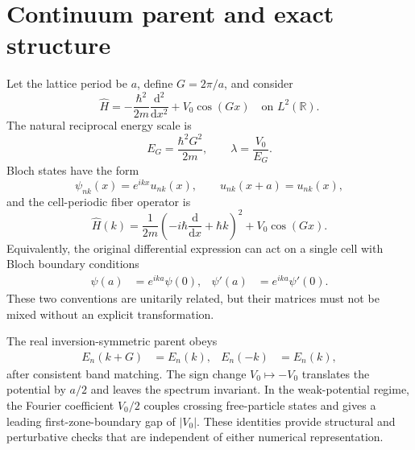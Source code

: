 \section{Continuum parent and exact structure}

Let the lattice period be $a$, define $G=2\pi/a$, and consider
\begin{equation}
    \hat H
    =
    -\frac{\hbar^2}{2m}
    \frac{\mathrm{d}^2}{\mathrm{d}x^2}
    +V_0\cos(Gx)
    \quad\text{on }L^2(\mathbb R).
    \label{eq:periodic-1d-parent}
\end{equation}
The natural reciprocal energy scale is
\begin{equation}
    E_G=\frac{\hbar^2G^2}{2m},
    \qquad
    \lambda=\frac{V_0}{E_G}.
    \label{eq:periodic-1d-scales}
\end{equation}
Bloch states have the form
\begin{equation}
    \psi_{nk}(x)=e^{ikx}u_{nk}(x),
    \qquad
    u_{nk}(x+a)=u_{nk}(x),
\end{equation}
and the cell-periodic fiber operator is
\begin{equation}
    \hat H(k)
    =
    \frac{1}{2m}
    \left(-i\hbar\frac{\mathrm{d}}{\mathrm{d}x}+\hbar k\right)^2
    +V_0\cos(Gx).
    \label{eq:periodic-1d-fiber}
\end{equation}
Equivalently, the original differential expression can act on a single cell
with Bloch boundary conditions
\begin{align}
    \psi(a)&=e^{ika}\psi(0),
    &
    \psi'(a)&=e^{ika}\psi'(0).
\end{align}
These two conventions are unitarily related, but their matrices must not be
mixed without an explicit transformation.

The real inversion-symmetric parent obeys
\begin{align}
    E_n(k+G)&=E_n(k),
    &
    E_n(-k)&=E_n(k),
    \label{eq:periodic-1d-symmetry}
\end{align}
after consistent band matching. The sign change $V_0\mapsto -V_0$ translates
the potential by $a/2$ and leaves the spectrum invariant. In the weak-potential
regime, the Fourier coefficient $V_0/2$ couples crossing free-particle states
and gives a leading first-zone-boundary gap of $|V_0|$. These identities provide
structural and perturbative checks that are independent of either numerical
representation.

